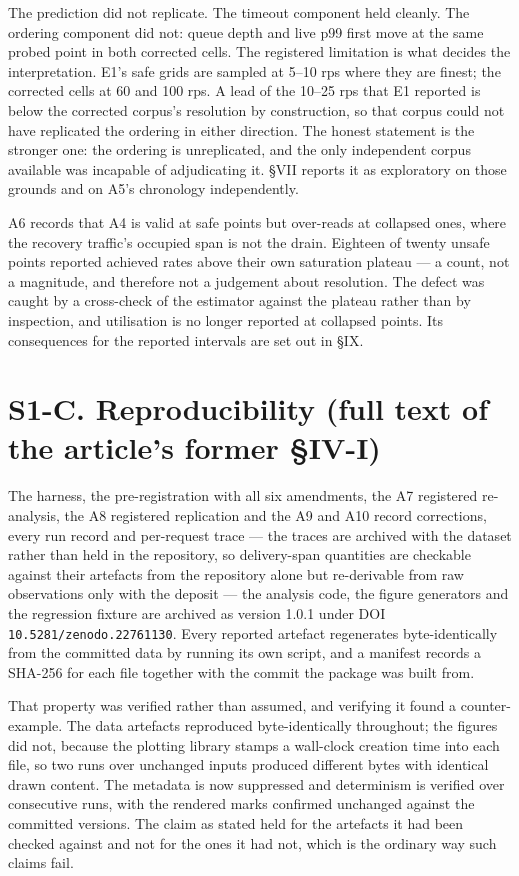 \documentclass{ieeeaccess}
\begin{document}
The prediction did not replicate. The timeout component held cleanly. The ordering component did not: queue depth and live p99 first move at the same probed point in both corrected cells. The registered limitation is what decides the interpretation. E1's safe grids are sampled at 5--10 rps where they are finest; the corrected cells at 60 and 100 rps. A lead of the 10--25 rps that E1 reported is below the corrected corpus's resolution by construction, so that corpus could not have replicated the ordering in either direction. The honest statement is the stronger one: the ordering is unreplicated, and the only independent corpus available was incapable of adjudicating it. \S{}VII reports it as exploratory on those grounds and on A5's chronology independently.

A6 records that A4 is valid at safe points but over-reads at collapsed ones, where the recovery traffic's occupied span is not the drain. Eighteen of twenty unsafe points reported achieved rates above their own saturation plateau --- a count, not a magnitude, and therefore not a judgement about resolution. The defect was caught by a cross-check of the estimator against the plateau rather than by inspection, and utilisation is no longer reported at collapsed points. Its consequences for the reported intervals are set out in \S{}IX.

\section*{S1-C. Reproducibility (full text of the article's former \S{}IV-I)}

The harness, the pre-registration with all six amendments, the A7 registered re-analysis, the A8 registered replication and the A9 and A10 record corrections, every run record and per-request trace --- the traces are archived with the dataset rather than held in the repository, so delivery-span quantities are checkable against their artefacts from the repository alone but re-derivable from raw observations only with the deposit --- the analysis code, the figure generators and the regression fixture are archived as version 1.0.1 under DOI \texttt{10.5281/zenodo.22761130}. Every reported artefact regenerates byte-identically from the committed data by running its own script, and a manifest records a SHA-256 for each file together with the commit the package was built from.

That property was verified rather than assumed, and verifying it found a counter-example. The data artefacts reproduced byte-identically throughout; the figures did not, because the plotting library stamps a wall-clock creation time into each file, so two runs over unchanged inputs produced different bytes with identical drawn content. The metadata is now suppressed and determinism is verified over consecutive runs, with the rendered marks confirmed unchanged against the committed versions. The claim as stated held for the artefacts it had been checked against and not for the ones it had not, which is the ordinary way such claims fail.
\end{document}
